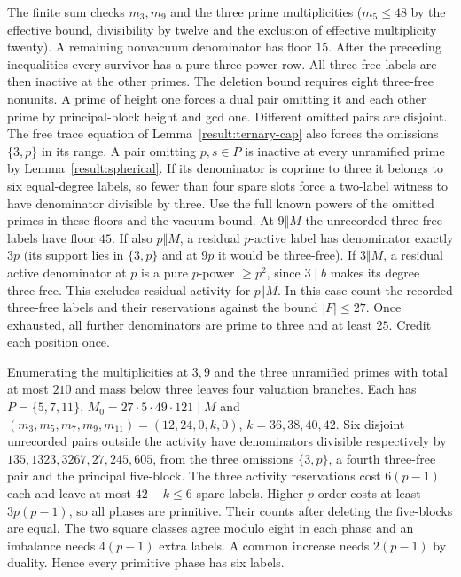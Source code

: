 \documentclass[11pt]{amsart}
\numberwithin{equation}{section}
\theoremstyle{definition}
\theoremstyle{plain}
\begin{document}
The finite sum checks $m_3,m_9$ and the three prime multiplicities
($m_5\le48$ by the effective bound, divisibility by twelve and the
exclusion of effective multiplicity twenty). A remaining nonvacuum
denominator has floor $15$. After the preceding inequalities every
survivor has a pure three-power row. All three-free labels are then
inactive at the other primes. The deletion bound requires eight
three-free nonunits. A prime of height one forces a dual pair omitting
it and each other prime by principal-block height and gcd one.
Different omitted pairs are disjoint. The free trace equation of
Lemma~\ref{result:ternary-cap} also forces the omissions $\{3,p\}$ in its
range. A pair omitting $p,s\in P$ is inactive at every unramified
prime by Lemma~\ref{result:spherical}. If its denominator is coprime to
three it belongs to six equal-degree labels, so fewer than four spare slots force a two-label witness to have denominator divisible by three. Use the full known powers
of the omitted primes in these floors and the vacuum bound. At
$9\Vert M$ the unrecorded three-free labels have floor $45$. If also
$p\Vert M$, a residual $p$-active label has denominator exactly $3p$
(its support lies in $\{3,p\}$ and at $9p$ it would be three-free).
If $3\Vert M$, a residual active denominator at $p$ is a pure
$p$-power $\ge p^2$, since $3\mid b$ makes its degree three-free.
This excludes residual activity for $p\Vert M$. In this case count
the recorded three-free labels and their reservations against the
bound $|F|\le27$. Once exhausted, all further denominators are
prime to three and at least $25$. Credit each position once.

Enumerating the multiplicities at $3,9$ and the three unramified primes
with total at most $210$ and mass below three leaves four valuation branches.
Each has $P=\{5,7,11\}$, $M_0=27\cdot5\cdot49\cdot121\mid M$ and
$(m_3,m_5,m_7,m_9,m_{11})=(12,24,0,k,0)$, $k=36,38,40,42$.
Six disjoint unrecorded pairs outside the activity have denominators
divisible respectively by $135,1323,3267,27,245,605$, from the three
omissions $\{3,p\}$, a fourth three-free pair and the principal five-block.
The three activity reservations cost $6(p-1)$ each and leave at most
$42-k\le6$ spare labels. Higher $p$-order costs at least $3p(p-1)$, so
all phases are primitive. Their counts after deleting the five-blocks
are equal. The two square classes agree modulo eight in each phase
and an imbalance needs $4(p-1)$ extra labels. A common increase needs
$2(p-1)$ by duality. Hence every primitive phase has six labels.
\end{document}
